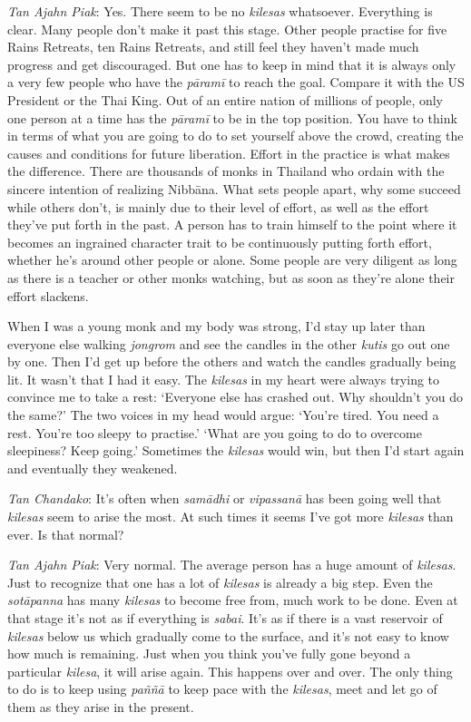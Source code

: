 \emph{Tan Ajahn Piak}: Yes. There seem to be no \emph{kilesas}
whatsoever. Everything is clear. Many people don't make it past this
stage. Other people practise for five Rains Retreats, ten Rains
Retreats, and still feel they haven't made much progress and get
discouraged. But one has to keep in mind that it is always only a very
few people who have the \emph{pāramī} to reach the goal. Compare it with
the US President or the Thai King. Out of an entire nation of millions
of people, only one person at a time has the \emph{pāramī} to be in the
top position. You have to think in terms of what you are going to do to
set yourself above the crowd, creating the causes and conditions for
future liberation. Effort in the practice is what makes the difference.
There are thousands of monks in Thailand who ordain with the sincere
intention of realizing Nibbāna. What sets people apart, why some succeed
while others don't, is mainly due to their level of effort, as well as
the effort they've put forth in the past. A person has to train himself
to the point where it becomes an ingrained character trait to be
continuously putting forth effort, whether he's around other people or
alone. Some people are very diligent as long as there is a teacher or
other monks watching, but as soon as they're alone their effort
slackens.

When I was a young monk and my body was strong, I'd stay up later than
everyone else walking \emph{jongrom} and see the candles in the other
\emph{kutis} go out one by one. Then I'd get up before the others and
watch the candles gradually being lit. It wasn't that I had it easy. The
\emph{kilesas} in my heart were always trying to convince me to take a
rest: `Everyone else has crashed out. Why shouldn't you do the same?'
The two voices in my head would argue: `You're tired. You need a rest.
You're too sleepy to practise.' `What are you going to do to overcome
sleepiness? Keep going.' Sometimes the \emph{kilesas} would win, but
then I'd start again and eventually they weakened.

\emph{Tan Chandako}: It's often when \emph{samādhi} or \emph{vipassanā}
has been going well that \emph{kilesas} seem to arise the most. At such
times it seems I've got more \emph{kilesas} than ever. Is that normal?

\emph{Tan Ajahn Piak}: Very normal. The average person has a huge amount
of \emph{kilesas}. Just to recognize that one has a lot of
\emph{kilesas} is already a big step. Even the \emph{sotāpanna} has many
\emph{kilesas} to become free from, much work to be done. Even at that
stage it's not as if everything is \emph{sabai}. It's as if there is a
vast reservoir of \emph{kilesas} below us which gradually come to the
surface, and it's not easy to know how much is remaining. Just when you
think you've fully gone beyond a particular \emph{kilesa}, it will arise
again. This happens over and over. The only thing to do is to keep using
\emph{paññā} to keep pace with the \emph{kilesas}, meet and let go of
them as they arise in the present.

